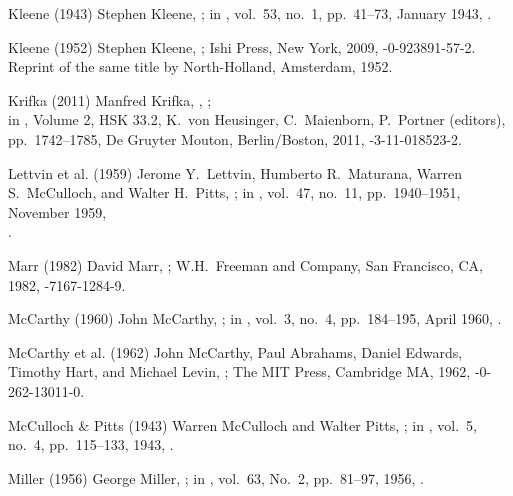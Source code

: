 \biblabel Kleene (1943)
Stephen Kleene,
;
in ,
vol.\ 53, no.\ 1, pp.\ 41--73, January 1943,
.

\biblabel Kleene (1952)
Stephen Kleene,
;
Ishi Press, New York, 2009,
-0-923891-57-2.
Reprint of the same title by
North-Holland, Amsterdam, 1952.

\biblabel Krifka (2011)
Manfred Krifka,
,
;\\
in ,
 Volume 2, HSK 33.2,
 K.\ von Heusinger, C.\ Maienborn, P.\ Portner (editors),
pp.\ 1742--1785,
De Gruyter Mouton, Berlin/Boston, 2011,
-3-11-018523-2.

\biblabel Lettvin et al. (1959)
Jerome Y.\ Lettvin, Humberto R.\ Maturana,
Warren S.\ McCulloch, and Walter H.\ Pitts,
;
in ,
vol.\ 47, no.\ 11, pp.\ 1940--1951, November 1959,\\
.

\biblabel Marr (1982)
David Marr,
;
W.H.\ Freeman and Company, San Francisco, CA, 1982,
-7167-1284-9.

\biblabel McCarthy (1960)
John McCarthy,
;
in ,
vol.\ 3, no.\ 4, pp.\ 184--195, April 1960,
.

\biblabel McCarthy et al. (1962)
John McCarthy, Paul Abrahams, Daniel Edwards,
Timothy Hart, and Michael Levin,
 ;
The MIT Press, Cambridge MA, 1962,
-0-262-13011-0.

\biblabel McCulloch \& Pitts (1943)
Warren McCulloch and Walter Pitts,
;
in ,
vol.\ 5, no.\ 4, pp.\ 115--133, 1943,
.

\biblabel Miller (1956)
 George Miller,
;
in ,
vol.\ 63, No.\ 2, pp.\ 81--97, 1956,
.


